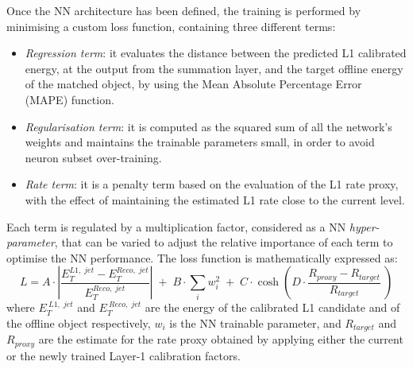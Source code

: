Once the NN architecture has been defined, the training is performed by minimising a custom loss function, containing three different terms:
\begin{itemize}
    \item \textit{Regression term}: it evaluates the distance between the predicted L1 calibrated energy, at the output from the summation layer, and the target offline energy of the matched object, by using the Mean Absolute Percentage Error (MAPE) function.
    \item \textit{Regularisation term}: it is computed as the squared sum of all the network’s weights and maintains the trainable parameters small, in order to avoid neuron subset over-training.
    \item \textit{Rate term}: it is a penalty term based on the evaluation of the L1 rate proxy, with the effect of maintaining the estimated L1 rate close to the current level.
\end{itemize}
Each term is regulated by a multiplication factor, considered as a NN \textit{hyper-parameter}, that can be varied to adjust the relative importance of each term to optimise the NN performance. The loss function is mathematically expressed as:
\begin{equation}
L = 
A\cdot\left|\frac{E_T^{L1,\;jet} - E_T^{Reco,\;jet}}{E_T^{Reco,\;jet}}\right|
\;+\;
B\cdot\sum_iw_i^2
\;+\;
C\cdot\cosh\left(D\cdot\frac{R_{proxy} - R_{target}}{R_{target}}\:\right)
\end{equation}
where $E_T^{\:L1,\;jet}$ and $E_T^{\:Reco,\;jet}$ are the energy of the calibrated L1 candidate and of the offline object respectively, $w_i$ is the NN trainable parameter, and $R_{target}$ and $R_{proxy}$ are the estimate for the rate proxy obtained by applying either the current or the newly trained Layer-1 calibration factors.

